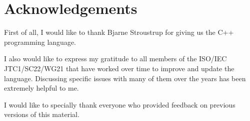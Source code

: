 \chapter*{Acknowledgements}

First of all, I would like to thank Bjarne Stroustrup for giving us 
the C++ programming language.

I also would like to express my gratitude to all members of the ISO/IEC
JTC1/SC22/WG21 that have worked over time to improve and update the language.
Discussing specific issues with many of them over the years has been extremely
helpful to me. 

I would like to specially thank everyone who provided feedback 
on previous versions of this material. 
